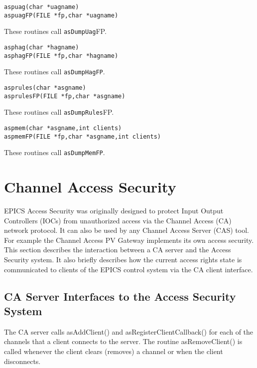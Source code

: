 \begin{verbatim}aspuag(char *uagname)
aspuagFP(FILE *fp,char *uagname)
\end{verbatim}
These routines call \verb|asDumpUag|FP.



\begin{verbatim}asphag(char *hagname)
asphagFP(FILE *fp,char *hagname)
\end{verbatim}
These routines call \verb|asDumpHagFP|.



\begin{verbatim}asprules(char *asgname)
asprulesFP(FILE *fp,char *asgname)
\end{verbatim}
These routines call \verb|asDumpRules|FP.



\begin{verbatim}aspmem(char *asgname,int clients)
aspmemFP(FILE *fp,char *asgname,int clients)
\end{verbatim}
These routines call \verb|asDumpMemFP|.

\section{Channel Access Security}

EPICS Access Security was originally designed to protect Input Output Controllers (IOCs) from unauthorized access via 
the Channel Access (CA) network protocol. It can also be used by any Channel Access Server (CAS) tool. For example 
the Channel Access PV Gateway implements its own access security. This  section describes the interaction between a CA 
server and the Access Security system. It also briefly describes how the current access rights state is communicated to 
clients of the EPICS control system via the CA client interface.

\subsection{CA Server Interfaces to the Access Security System}

The CA server calls asAddClient() and asRegisterClientCallback() for each of the channels that a client 
connects to the server. The routine asRemoveClient() is called whenever the client clears (removes) a channel or 
when the client disconnects. 

